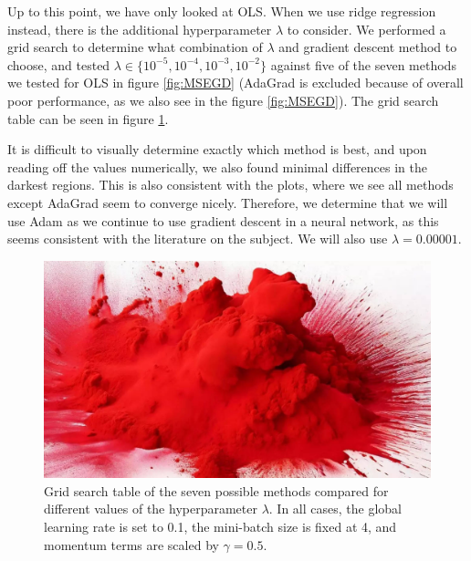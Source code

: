 Up to this point, we have only looked at OLS. When we use ridge regression instead, there is the additional hyperparameter $\lambda$ to consider. We performed a grid search to determine what combination of $\lambda$ and gradient descent method to choose, and tested $\lambda \in \{10^{-5}, 10^{-4}, 10^{-3}, 10^{-2}\}$ against five of the seven methods we tested for OLS in figure \ref{fig:MSEGD} (AdaGrad is excluded because of overall poor performance, as we also see in the figure \ref{fig:MSEGD}). The grid search table can be seen in figure \ref{fig:gridsearch_ridge}. 

It is difficult to visually determine exactly which method is best, and upon reading off the values numerically, we also found minimal differences in the darkest regions. This is also consistent with the plots, where we see all methods except AdaGrad seem to converge nicely. Therefore, we determine that we will use Adam as we continue to use gradient descent in a neural network, as this seems consistent with the literature on the subject. We will also use $\lambda = 0.00001$.
\begin{figure}
    \centering
    \includegraphics[width=\linewidth]{figures/placeholders/gridsearch_ridge.png}
    \caption{Grid search table of the seven possible methods compared for different values of the hyperparameter $\lambda$. In all cases, the global learning rate is set to 0.1, the mini-batch size is fixed at 4, and momentum terms are scaled by $\gamma = 0.5$.}
    \label{fig:gridsearch_ridge}
\end{figure}

